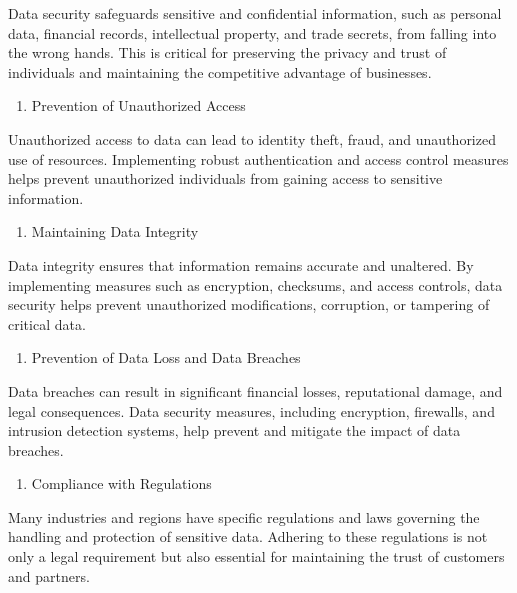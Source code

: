 \documentclass[
  letterpaper,
  DIV=11,
  numbers=noendperiod]{scrreprt}
\providecommand{\tightlist}{%
  \setlength{\itemsep}{0pt}\setlength{\parskip}{0pt}}\usepackage{longtable,booktabs,array}
\begin{document}
Data security safeguards sensitive and confidential information, such as
personal data, financial records, intellectual property, and trade
secrets, from falling into the wrong hands. This is critical for
preserving the privacy and trust of individuals and maintaining the
competitive advantage of businesses.

\begin{enumerate}
\def\labelenumi{\arabic{enumi}.}
\setcounter{enumi}{1}
\tightlist
\item
  Prevention of Unauthorized Access
\end{enumerate}

Unauthorized access to data can lead to identity theft, fraud, and
unauthorized use of resources. Implementing robust authentication and
access control measures helps prevent unauthorized individuals from
gaining access to sensitive information.

\begin{enumerate}
\def\labelenumi{\arabic{enumi}.}
\setcounter{enumi}{2}
\tightlist
\item
  Maintaining Data Integrity
\end{enumerate}

Data integrity ensures that information remains accurate and unaltered.
By implementing measures such as encryption, checksums, and access
controls, data security helps prevent unauthorized modifications,
corruption, or tampering of critical data.

\begin{enumerate}
\def\labelenumi{\arabic{enumi}.}
\setcounter{enumi}{3}
\tightlist
\item
  Prevention of Data Loss and Data Breaches
\end{enumerate}

Data breaches can result in significant financial losses, reputational
damage, and legal consequences. Data security measures, including
encryption, firewalls, and intrusion detection systems, help prevent and
mitigate the impact of data breaches.

\begin{enumerate}
\def\labelenumi{\arabic{enumi}.}
\setcounter{enumi}{4}
\tightlist
\item
  Compliance with Regulations
\end{enumerate}

Many industries and regions have specific regulations and laws governing
the handling and protection of sensitive data. Adhering to these
regulations is not only a legal requirement but also essential for
maintaining the trust of customers and partners.
\end{document}
